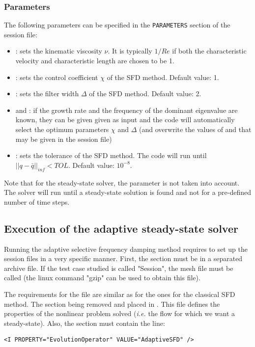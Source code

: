 \subsubsection{Parameters}

The following parameters can be specified in the \texttt{PARAMETERS} section of the session file:

\begin{itemize}
\item {}: sets the kinematic viscosity $\nu$. It is typically $1/Re$ if both the characteristic velocity and characteristic length are chosen to be 1. 
\item {}: sets the control coefficient $\chi$ of the SFD method. Default value: 1.
\item {}: sets the filter width $\Delta$ of the SFD method. Default value: 2.
\item {} and : if the growth rate and the frequency of the dominant eigenvalue are known, they can be given given as input and the code will automatically select the optimum parameters $\chi$ and $\Delta$ (and overwrite the values of  and  that may be given in the session file)
\item {}: sets the tolerance of the SFD method. The code will run until $||q-\bar{q}||_{inf}<TOL$.  Default value: $10^{-8}$.
\end{itemize}

Note that for the steady-state solver, the parameter  is not taken into account. The solver will run until a steady-state solution is found and not for a pre-defined number of time steps.

\subsection{Execution of the adaptive steady-state solver}

Running the adaptive selective frequency damping method requires to set up the session files in a very specific manner. First, the  section must be in a separated archive file. If the test case studied is called "Session", the mesh file must be called  (the linux command "gzip" can be used to obtain this file).

The requirements for the file  are similar as for the ones for the classical SFD method. The  section being removed and placed in . This file defines the properties of the nonlinear problem solved (\textit{i.e.} the flow for which we want a steady-state). Also, the  section must contain the line:
\begin{lstlisting}[style=XMLStyle]
<I PROPERTY="EvolutionOperator" VALUE="AdaptiveSFD" />
\end{lstlisting}

